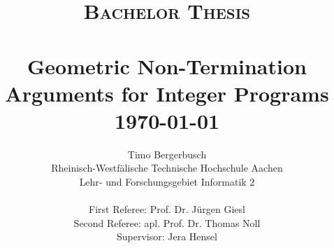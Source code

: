 
\title{ \normalsize \textsc{Bachelor Thesis}
	\\ [2.0cm]
	\HRule{0.5pt} \\
	\LARGE \textbf{Geometric Non-Termination Arguments for Integer Programs}
	\HRule{2pt} \\ [0.5cm]
	\normalsize \coverFormat\today \vspace*{5\baselineskip}}

\date{}

\author{
	Timo Bergerbusch\\ 
	Rheinisch-Westfälische Technische Hochschule Aachen \\
	Lehr- und Forschungsgebiet Informatik 2  \\ \\
	First Referee: Prof. Dr. Jürgen Giesl \\
	Second Referee: apl. Prof. Dr. Thomas Noll \\
	Supervisor: Jera Hensel
	}

\maketitle